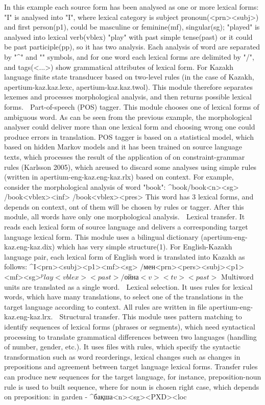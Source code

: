 \documentclass[a4paper,twocolumn,11pt]{article}
\begin{document}
In this example each source form has been analysed as one or more lexical forms: "I" is analysed into "I", where lexical category is subject pronoun(<prn><subj>) and first person(p1), could be masculine or feminine(mf), singular(sg); "played" is analysed into lexical verb(vblex) "play" with past simple tense(past) or it could be past participle(pp), so it has two analysis. Each analysis of word are separated by "^" and "" symbols, and for one word each lexical forms are delimited by "/", and tags(<...>) show grammatical attributes of lexical form. 
 For Kazakh language finite state transducer based on two-level rules (in the case of Kazakh, apertium-kaz.kaz.lexc, apertium-kaz.kaz.twol). This module therefore separates lexemes and processes morphological analysis, and then returns possible lexical forms.
	Part-of-speech (POS) tagger. This module chooses one of lexical forms of ambiguous word. As can be seen from the previous example, the morphological analyser could deliver more than one lexical form and choosing wrong one could produce errors in translation. POS tagger is based on a statistical model, which based on hidden Markov models and it has been trained on source language texts, which processes the result of the application of  on constraint-grammar rules (Karlsson 2005), which areused to discard some analyses  using simple rules (written in apertium-eng-kaz.eng-kaz.rlx) based on context. For example, consider the morphological analysis of word "book":
^book/book<n><sg>
/book<vblex><inf>
/book<vblex><pres>
This word has 3 lexical forms, and depends on context, ont of them will be chosen by rules or tagger. After  this module, all words have only one morphological analysis.
	Lexical transfer. It reads each lexical form of source language and delivers a corresponding target language lexical form. This module uses a bilingual dictionary (apertium-eng-kaz.eng-kaz.dix) which has very simple structure(1). For English-Kazakh language pair, each lexical form of English word is translated into Kazakh as follows:
^I<prn><subj><p1><mf><sg> /мен<prn><pers><subj><p1><mf><sg>$ 
^play<vblex><past>/ойна<v><tv><past>$
 Multiword units are translated as a single word.
	Lexical selection. It uses rules for lexical words, which have many translations, to select one of the translations in the target language according to context. All rules are written in file apertium-eng-kaz.eng-kaz.lrx.
	Structural transfer. This module uses pattern matching to identify sequences of lexical forms  (phrases or segments), which need syntactical processing to translate grammatical differences between two languages (handling of number, gender, etc.). It uses  files with rules, which specify  the syntactic transformation such as word reorderings, lexical changes such as changes in prepositions and agreement between target language lexical forms. Transfer rules can produce new sequences for the  target language, for instance, preposition-noun rule is used to built sequence, where for noun is chosen right case, which depends on preposition: 
in garden  -  ^бақша<n><sg><PXD><loc
  
\end{document}
